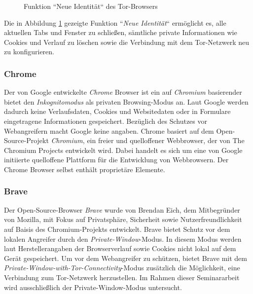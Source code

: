 \begin{figure}[h!]
	\caption{Funktion ``Neue Identität`` des Tor-Browsers}
	\label{img:tor-new-identity}
\end{figure}
Die in Abbildung \ref{img:tor-new-identity} gezeigte Funktion ``\textit{Neue Identität}`` ermöglicht es, alle aktuellen Tabs und Fenster zu schließen, sämtliche private Informationen wie Cookies und Verlauf zu löschen sowie die Verbindung mit dem Tor-Netzwerk neu zu konfigurieren. \cite{Tor.24.05.2023}

\subsubsection*{Chrome}
\label{subsubsection:methodik-vorbereitung-browserauswahl-chrome}
Der von Google entwickelte \textit{Chrome} Browser ist ein auf \textit{Chromium} basierender bietet den \textit{Inkognitomodus} als privaten Browsing-Modus an. Laut Google werden dadurch keine Verlaufsdaten, Cookies und Websitedaten oder in Formulare eingetragene Informationen gespeichert.
Bezüglich des Schutzes vor Webangreifern macht Google keine angaben.
Chrome basiert auf dem Open-Source-Projekt \textit{Chromium}, ein freier und quelloffener Webbrowser, der von The Chromium Projects entwickelt wird.
Dabei handelt es sich um eine von Google initiierte quelloffene Plattform für die Entwicklung von Webbrowsern.
Der Chrome Browser selbst enthält proprietäre Elemente. \cite{GoogleChrome.}

\subsubsection*{Brave}
\label{subsubsection:methodik-vorbereitung-browserauswahl-brave}
Der Open-Source-Browser \textit{Brave} wurde von Brendan Eich, dem Mitbegründer von Mozilla, mit Fokus auf Privatsphäre, Sicherheit sowie Nutzerfreundlichkeit auf Baisis des Chromium-Projekts entwickelt. 
Brave bietet Schutz vor dem lokalen Angreifer durch den \textit{Private-Window}-Modus. In diesem Modus werden laut Herstellerangaben der Browserverlauf sowie Cookies nicht lokal auf dem Gerät gespeichert. 
Um vor dem Webangreifer zu schützen, bietet Brave mit dem \textit{Private-Window-with-Tor-Connectivity}-Modus zusätzlich die Möglichkeit, eine Verbindung zum Tor-Netzwerk herzustellen. \cite{Brave.} Im Rahmen dieser Seminararbeit wird ausschließlich der Private-Window-Modus untersucht.

